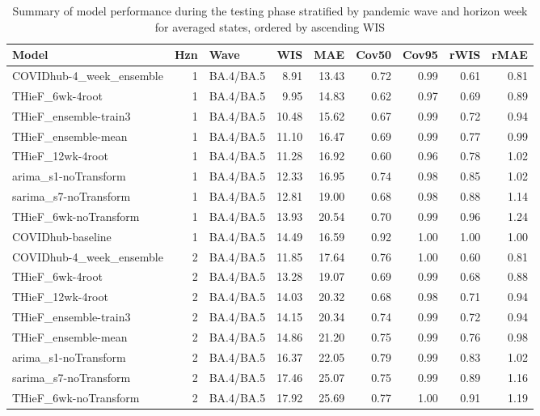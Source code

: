 \documentclass[thesis]{umassthesis}  %
\begin{document}
\begingroup\renewcommand{\arraystretch}{0.75} \setlength{\tabcolsep}{3pt}
\begin{longtable}{lrlrrrrrr}
\caption{Summary of model performance during the testing phase stratified by pandemic wave and horizon week for averaged states, ordered by ascending WIS} \\ 
  \hline
Model & Hzn & Wave & WIS & MAE & Cov50 & Cov95 & rWIS & rMAE \\ 
  \hline
COVIDhub-4\_week\_ensemble & 1 & BA.4/BA.5 & 8.91 & 13.43 & 0.72 & 0.99 & 0.61 & 0.81 \\ 
  THieF\_6wk-4root & 1 & BA.4/BA.5 & 9.95 & 14.83 & 0.62 & 0.97 & 0.69 & 0.89 \\ 
  THieF\_ensemble-train3 & 1 & BA.4/BA.5 & 10.48 & 15.62 & 0.67 & 0.99 & 0.72 & 0.94 \\ 
  THieF\_ensemble-mean & 1 & BA.4/BA.5 & 11.10 & 16.47 & 0.69 & 0.99 & 0.77 & 0.99 \\ 
  THieF\_12wk-4root & 1 & BA.4/BA.5 & 11.28 & 16.92 & 0.60 & 0.96 & 0.78 & 1.02 \\ 
  arima\_s1-noTransform & 1 & BA.4/BA.5 & 12.33 & 16.95 & 0.74 & 0.98 & 0.85 & 1.02 \\ 
  sarima\_s7-noTransform & 1 & BA.4/BA.5 & 12.81 & 19.00 & 0.68 & 0.98 & 0.88 & 1.14 \\ 
  THieF\_6wk-noTransform & 1 & BA.4/BA.5 & 13.93 & 20.54 & 0.70 & 0.99 & 0.96 & 1.24 \\ 
  COVIDhub-baseline & 1 & BA.4/BA.5 & 14.49 & 16.59 & 0.92 & 1.00 & 1.00 & 1.00 \\ 
  COVIDhub-4\_week\_ensemble & 2 & BA.4/BA.5 & 11.85 & 17.64 & 0.76 & 1.00 & 0.60 & 0.81 \\ 
  THieF\_6wk-4root & 2 & BA.4/BA.5 & 13.28 & 19.07 & 0.69 & 0.99 & 0.68 & 0.88 \\ 
  THieF\_12wk-4root & 2 & BA.4/BA.5 & 14.03 & 20.32 & 0.68 & 0.98 & 0.71 & 0.94 \\ 
  THieF\_ensemble-train3 & 2 & BA.4/BA.5 & 14.15 & 20.34 & 0.74 & 0.99 & 0.72 & 0.94 \\ 
  THieF\_ensemble-mean & 2 & BA.4/BA.5 & 14.86 & 21.20 & 0.75 & 0.99 & 0.76 & 0.98 \\ 
  arima\_s1-noTransform & 2 & BA.4/BA.5 & 16.37 & 22.05 & 0.79 & 0.99 & 0.83 & 1.02 \\ 
  sarima\_s7-noTransform & 2 & BA.4/BA.5 & 17.46 & 25.07 & 0.75 & 0.99 & 0.89 & 1.16 \\ 
  THieF\_6wk-noTransform & 2 & BA.4/BA.5 & 17.92 & 25.69 & 0.77 & 1.00 & 0.91 & 1.19 \\ 

\end{longtable}
\end{document}
